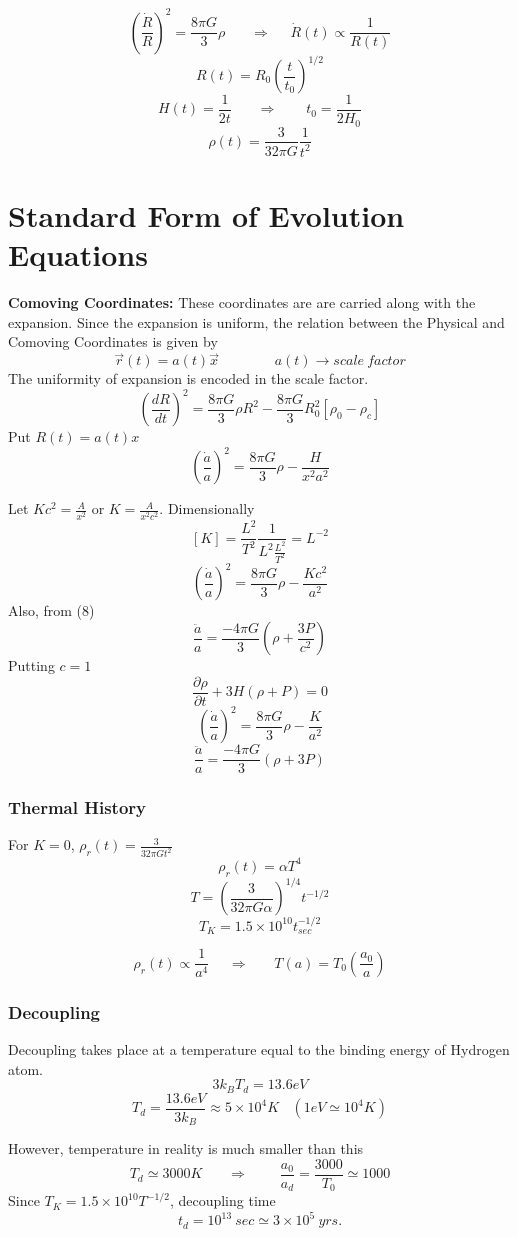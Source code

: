 \documentclass[xcolor=dvipsnames]{beamer}
\begin{document}
\begin{frame}
\[ \left(\frac{\dot{R}}{R}\right)^2 = \frac{8\pi G}{3}\rho
~~~~~~~~\Rightarrow~~~~~~ \dot{R}(t) \propto \frac{1}{R(t)} \]
\[ \boxed{ R(t) = R_0 \left(\frac{t}{t_0}\right)^{1/2} } \]
\[ H(t) = \frac{1}{2t}~~~~~~~~\Rightarrow~~~~~~~~~\boxed{t_0=\frac{1}{2H_0}} \]
\[ \rho(t) = \frac{3}{32\pi G} \frac{1}{t^2}  \]
\end{frame}

\section{Standard Form of Evolution Equations}

\begin{frame}
{\bf Comoving Coordinates:} These coordinates are are carried along with the
expansion. Since the expansion is uniform, the relation between the Physical
and Comoving Coordinates is given by
\[ \vec{r}(t) = a(t)\vec{x}~~~~~~~~~~~~~~~~~~ a(t) \rightarrow scale~factor \]
The uniformity of expansion is encoded in the scale factor.
\[ \left(\frac{dR}{dt}\right)^2 = \frac{8\pi G}{3}\rho R^2
-\frac{8\pi G}{3}R_0^2[\rho_0-\rho_c]  \]
Put $R(t) = a(t)x$
\[ \left(\frac{\dot{a}}{a}\right)^2 = \frac{8\pi G}{3}\rho -\frac{H}{x^2a^2} \]
\end{frame}

\begin{frame}
Let $Kc^2=\frac{A}{x^2}$ or $K=\frac{A}{x^2c^2}$. Dimensionally
\[ [K] = \frac{L^2}{T^2}\frac{1}{L^2\frac{L^2}{T^2}} = L^{-2} \]
\[ \left(\frac{\dot{a}}{a}\right)^2 = \frac{8\pi G}{3}\rho -\frac{Kc^2}{a^2} \]
Also, from (8)
\[ \frac{\ddot{a}}{a} = \frac{-4\pi G}{3}\left(\rho + \frac{3P}{c^2}\right) \]
Putting $c=1$
\[ \boxed{ \frac{\partial\rho}{\partial t} + 3H(\rho+P) = 0 } \]
\[\boxed{\left(\frac{\dot{a}}{a}\right)^2 = \frac{8\pi G}{3}\rho -\frac{K}{a^2} } \]
\[ \boxed{ \frac{\ddot{a}}{a} = \frac{-4\pi G}{3}(\rho + 3P) } \]
\end{frame}

\begin{frame}
\frametitle{Thermal History}
For $K=0$, $\rho_r(t) = \frac{3}{32\pi Gt^2}$
\[ \rho_r(t) = \alpha T^4  \]
\[\boxed{T = \left(\frac{3}{32\pi G\alpha}\right)^{1/4}t^{-1/2} } \]
\[ \boxed{T_K = 1.5\times 10^{10} t_{sec}^{-1/2} } \]

\[ \rho_r(t) \propto \frac{1}{a^4}~~~~~~\Rightarrow~~~~~~~~
 T(a) = T_0\left(\frac{a_0}{a}\right) \]
\end{frame}


\begin{frame}
\frametitle{Decoupling}
Decoupling takes place at a temperature equal to the binding energy of 
Hydrogen atom.
\[ 3k_BT_d = 13.6 eV \]
\[ T_d = \frac{13.6 eV}{3k_B} \approx 5\times 10^4K~~~~(1eV \simeq 10^4K) \]

However, temperature in reality is much smaller than this
\[ T_d \simeq 3000 K~~~~~~~~\Rightarrow~~~~~~~~~~
\frac{a_0}{a_d}=\frac{3000}{T_0} \simeq 1000 \]
Since $T_K = 1.5\times 10^{10} T^{-1/2}$, decoupling time
\[ t_d = 10^{13}~sec \simeq 3\times 10^5~yrs. \]
\end{frame}
\end{document}
